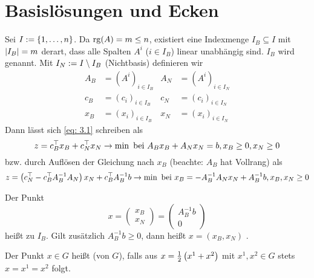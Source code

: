 \section{Basislösungen und Ecken}

Sei $I \mathrel{:=} \left\{ 1, \dots , n \right\}$. Da $\operatorname{rg}(A) = m \le n$, existiert eine Indexmenge $I_B \subseteq I$ mit $\left| I_B \right| = m$ derart, dass alle Spalten $A^i$ ($i \in I_B$) linear unabhängig sind. $I_B$ wird  genannt. Mit $I_N \mathrel{:=} I \setminus I_B$ (Nichtbasis) definieren wir
\begin{align*}
A_B &= (A^i)_{i \in I_B} & A_N &= (A^i)_{i \in I_N} \\
c_B &= (c_i)_{i \in I_B} & c_N &= (c_i)_{i \in I_N} \\
x_B &= (x_i)_{i \in I_B} & x_N &= (x_i)_{i \in I_N}
\end{align*}
Dann lässt sich \eqref{eq: 3.1} schreiben als
\begin{equation}
	z = c_B^{\top} x_B + c_N^{\top} x_N \to \min \text{ bei } A_B x_B + A_N x_N = b, x_B \ge 0, x_N \ge 0 \label{eq: 3.2}
\end{equation}
bzw. durch Auflösen der Gleichung nach $x_B$ (beachte: $A_B$ hat Vollrang) als
\begin{equation}
	z = \left( c_N^{\top} - c_B^{\top} A_B^{-1}A_N \right) x_N + c_B^{\top} A_B^{-1} b \to \min \text{ bei } x_B = -A_B^{-1} A_N x_N + A_B^{-1}b, x_B, x_N \ge 0 \label{eq: 3.3}
\end{equation}

\begin{definition} %
	Der Punkt 
	\begin{equation*}
		x = \left(\begin{matrix} x_B \\ x_N \end{matrix} \right) = \left( \begin{matrix} A_B^{-1} b \\ 0 \end{matrix} \right)
	\end{equation*}
	heißt  zu  $I_B$. Gilt zusätzlich $A_B^{-1}b \ge 0$, dann heißt $x=(x_B,x_N)$ .
\end{definition}

\begin{definition} %
	Der Punkt $x \in G$ heißt  (von $G$), falls aus $x = \frac{1}{2} \left( x^1 + x^2 \right)$ mit $x^1,x^2 \in G$ stets $x = x^1 = x^2$ folgt.
\end{definition}

